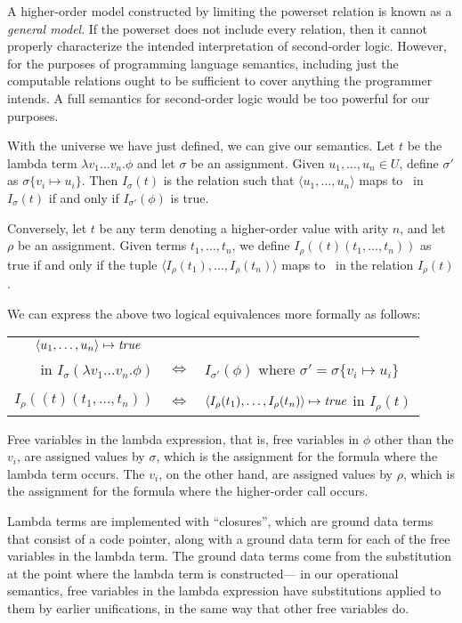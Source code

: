 A higher-order model constructed by limiting the powerset relation
is known as a \emph{general model}.
If the powerset does not include every relation,
then it cannot properly characterize the intended interpretation
of second-order logic.
However, for the purposes of programming language semantics,
including just the computable relations
ought to be sufficient to cover
anything the programmer intends.
A full semantics for second-order logic
would be too powerful for our purposes.

With the universe we have just defined,
we can give our semantics.
Let $t$ be the lambda term $\lambda v_1 \ldots v_n. \phi$
and let $\sigma$ be an assignment.
Given $u_1, \ldots, u_n \in U$,
define $\sigma'$ as $\sigma \{ v_i \mapsto u_i \}$.
Then $I_\sigma(t)$ is the relation such that
$\langle u_1, \ldots, u_n \rangle$ maps to \true\ in $I_\sigma(t)$
if and only if $I_{\sigma'}(\phi)$ is true.

Conversely, let $t$ be any term denoting a higher-order value with arity $n$,
and let $\rho$ be an assignment.
Given terms $t_1, \ldots, t_n$,
we define $I_\rho((t)(t_1, \ldots, t_n))$ as true
if and only if the tuple
$\langle I_\rho(t_1), \ldots, I_\rho(t_n) \rangle$
maps to \true\ in the relation $I_\rho(t)$.

We can express the above two logical equivalences
more formally as follows:

\begin{center}
\begin{tabular}{rcl}
$\langle u_1, \ldots, u_n \rangle \mapsto \text{\textit{true}} \quad$ & &
\\
in $I_\sigma(\lambda v_1 \ldots v_n. \phi)$
& $\iff$ &
$I_{\sigma'}(\phi)$
where $\sigma' = \sigma \{ v_i \mapsto u_i \}$
\\
\\
$I_\rho((t)(t_1, \ldots, t_n))$
& $\iff$ &
$\langle I_\rho(t_1), \ldots, I_\rho(t_n) \rangle
\mapsto \text{\textit{true}}$ in $I_\rho(t)$
\\
\end{tabular}
\end{center}

\noindent
Free variables in the lambda expression,
that is, free variables in $\phi$ other than the $v_i$,
are assigned values by $\sigma$,
which is the assignment for the formula
where the lambda term occurs.
The $v_i$, on the other hand,
are assigned values by $\rho$,
which is the assignment for the formula
where the higher-order call occurs.

Lambda terms are implemented with ``closures\label{gi:closure}'',
which are ground data terms that consist of a code pointer,
along with a ground data term for each of the free variables
in the lambda term.
The ground data terms come from the substitution
at the point where the lambda term is constructed---%
in our operational semantics,
free variables in the lambda expression
have substitutions applied to them by earlier unifications,
in the same way that other free variables do.

